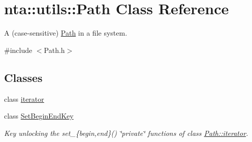 \hypertarget{classnta_1_1utils_1_1Path}{}\section{nta\+:\+:utils\+:\+:Path Class Reference}
\label{classnta_1_1utils_1_1Path}


A (case-\/sensitive) \hyperlink{classnta_1_1utils_1_1Path}{Path} in a file system.  




{\ttfamily \#include $<$Path.\+h$>$}

\subsection*{Classes}
\begin{DoxyCompactItemize}
\item 
class \hyperlink{classnta_1_1utils_1_1Path_1_1iterator}{iterator}
\item 
class \hyperlink{classnta_1_1utils_1_1Path_1_1SetBeginEndKey}{Set\+Begin\+End\+Key}
\begin{DoxyCompactList}\small\item\em Key unlocking the set\+\_\+\{begin,end\}() \char`\"{}private\char`\"{} functions of class \hyperlink{classnta_1_1utils_1_1Path_1_1iterator}{Path\+::iterator}. \end{DoxyCompactList}\end{DoxyCompactItemize}
